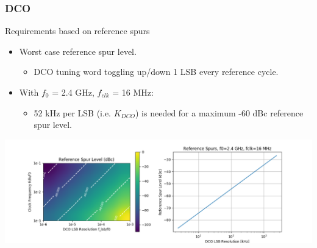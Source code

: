 \documentclass[t, screen, aspectratio=43]{beamer}
\begin{document}
\begin{frame}
	\frametitle{DCO}
	\begin{block}{Requirements based on reference spurs}
		\vspace{-.2em}
		\begin{itemize}
			\footnotesize
			\item Worst case reference spur level.
				\begin{itemize}
					\scriptsize			
					\item DCO tuning word toggling up/down 1 LSB every reference cycle.
				\end{itemize} 	
			\item With $f_0$ = 2.4 GHz, $f_{clk}$ = 16 MHz:
			\begin{itemize}
				\scriptsize			
				\item 52 kHz per LSB (i.e. $K_{DCO}$) is needed for a maximum -60 dBc reference spur level. 
			\end{itemize} 
		\end{itemize}  
		\vspace{-1em}
		\center\includegraphics[width=1.0\textwidth, angle=0]{refspur_level.png}
		\vspace{-0.5em}  
	\end{block}
\end{frame}
\end{document}
